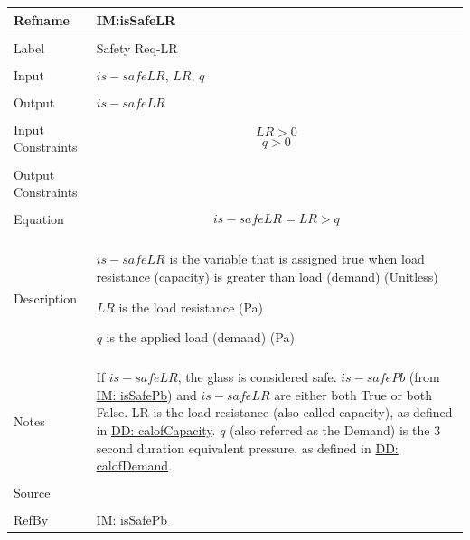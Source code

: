 \documentclass[12pt]{article}
\begin{document}
\noindent \begin{minipage}{\textwidth}
\begin{tabular}{>{\raggedright}p{}>{\raggedright\arraybackslash}p{}}
\toprule \textbf{Refname} & \textbf{IM:isSafeLR}
\label{IM:isSafeLR}
\\ \midrule \\
Label & Safety Req-LR
        
\\ \midrule \\
Input & $is-safeLR$, $LR$, $q$
        
\\ \midrule \\
Output & $is-safeLR$
         
\\ \midrule \\
Input Constraints & \begin{displaymath}
                    LR>0
                    \end{displaymath}
                    \begin{displaymath}
                    q>0
                    \end{displaymath}
\\ \midrule \\
Output Constraints & 
\\ \midrule \\
Equation & \begin{displaymath}
           is-safeLR=LR>q
           \end{displaymath}
\\ \midrule \\
Description & \begin{symbDescription}
              \item{$is-safeLR$ is the variable that is assigned true when load resistance (capacity) is greater than load (demand) (Unitless)}
              \item{$LR$ is the load resistance (Pa)}
              \item{$q$ is the applied load (demand) (Pa)}
              \end{symbDescription}
\\ \midrule \\
Notes & If $is-safeLR$, the glass is considered safe. $is-safePb$ (from \hyperref[IM:isSafePb]{IM: isSafePb}) and $is-safeLR$ are either both True or both False. LR is the load resistance (also called capacity), as defined in \hyperref[DD:calofCapacity]{DD: calofCapacity}. $q$ (also referred as the Demand) is the 3 second duration equivalent pressure, as defined in \hyperref[DD:calofDemand]{DD: calofDemand}.
        
\\ \midrule \\
Source & \cite{astm2009}
         
\\ \midrule \\
RefBy & \hyperref[IM:isSafePb]{IM: isSafePb}
        
\\ \bottomrule
\end{tabular}
\end{minipage}
\end{document}
